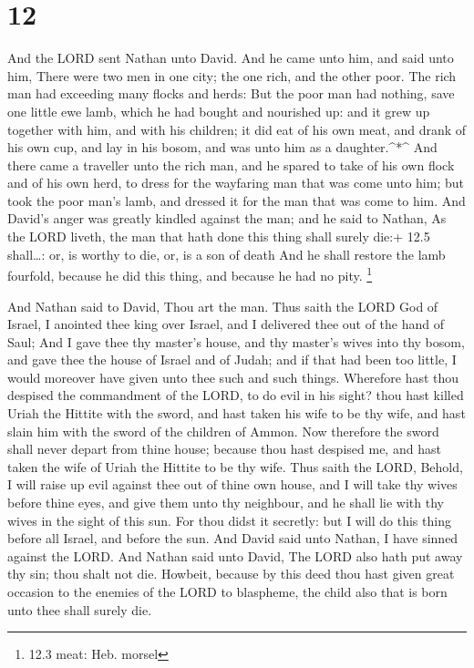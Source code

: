 \hypertarget{section-11}{%
\section{12}\label{section-11}}

 And the LORD sent Nathan unto David. And he came unto him,
and said unto him, There were two men in one city; the one rich, and the
other poor.  The rich man had exceeding many flocks and
herds:  But the poor man had nothing, save one little ewe
lamb, which he had bought and nourished up: and it grew up together with
him, and with his children; it did eat of his own meat, and drank of his
own cup, and lay in his bosom, and was unto him as a daughter.\^{}*\^{}
 And there came a traveller unto the rich man, and he spared
to take of his own flock and of his own herd, to dress for the wayfaring
man that was come unto him; but took the poor man's lamb, and dressed it
for the man that was come to him.  And David's anger was
greatly kindled against the man; and he said to Nathan, As the LORD
liveth, the man that hath done this thing shall surely die:+ 12.5
shall\ldots: or, is worthy to die, or, is a son of death 
And he shall restore the lamb fourfold, because he did this thing, and
because he had no pity. \footnote{12.3 meat: Heb. morsel}

 And Nathan said to David, Thou art the man. Thus saith the
LORD God of Israel, I anointed thee king over Israel, and I delivered
thee out of the hand of Saul;  And I gave thee thy master's
house, and thy master's wives into thy bosom, and gave thee the house of
Israel and of Judah; and if that had been too little, I would moreover
have given unto thee such and such things.  Wherefore hast
thou despised the commandment of the LORD, to do evil in his sight? thou
hast killed Uriah the Hittite with the sword, and hast taken his wife to
be thy wife, and hast slain him with the sword of the children of Ammon.
 Now therefore the sword shall never depart from thine
house; because thou hast despised me, and hast taken the wife of Uriah
the Hittite to be thy wife.  Thus saith the LORD, Behold, I
will raise up evil against thee out of thine own house, and I will take
thy wives before thine eyes, and give them unto thy neighbour, and he
shall lie with thy wives in the sight of this sun.  For
thou didst it secretly: but I will do this thing before all Israel, and
before the sun.  And David said unto Nathan, I have sinned
against the LORD. And Nathan said unto David, The LORD also hath put
away thy sin; thou shalt not die.  Howbeit, because by this
deed thou hast given great occasion to the enemies of the LORD to
blaspheme, the child also that is born unto thee shall surely die.

